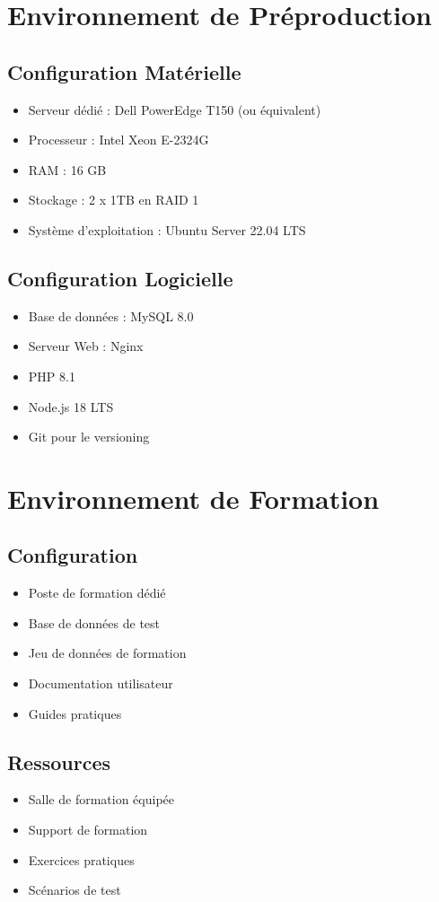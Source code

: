 \documentclass[14pt,a4paper]{report}
\begin{document}
\section{Environnement de Préproduction}
\subsection{Configuration Matérielle}
\begin{itemize}
    \item Serveur dédié : Dell PowerEdge T150 (ou équivalent)
    \item Processeur : Intel Xeon E-2324G
    \item RAM : 16 GB
    \item Stockage : 2 x 1TB en RAID 1
    \item Système d'exploitation : Ubuntu Server 22.04 LTS
\end{itemize}

\subsection{Configuration Logicielle}
\begin{itemize}
    \item Base de données : MySQL 8.0
    \item Serveur Web : Nginx
    \item PHP 8.1
    \item Node.js 18 LTS
    \item Git pour le versioning
\end{itemize}

\section{Environnement de Formation}
\subsection{Configuration}
\begin{itemize}
    \item Poste de formation dédié
    \item Base de données de test
    \item Jeu de données de formation
    \item Documentation utilisateur
    \item Guides pratiques
\end{itemize}

\subsection{Ressources}
\begin{itemize}
    \item Salle de formation équipée
    \item Support de formation
    \item Exercices pratiques
    \item Scénarios de test
\end{itemize}
\end{document}
